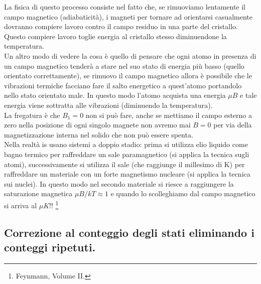 La fisica di questo processo consiste nel fatto che, se rimuoviamo lentamente il campo magnetico (adiabaticità), i magneti per tornare ad orientarsi casualmente dovranno compiere lavoro contro il campo residuo in una parte del cristallo. Questo compiere lavoro toglie energia al cristallo stesso diminuendone la temperatura.\\
Un altro modo di vedere la cosa è quello di pensare che ogni atomo in presenza di un campo magnetico tenderà a stare nel suo stato di energia più basso (quello orientato correttamente), se rimuovo il campo magnetico allora è possibile che le vibrazioni termiche facciano fare il salto energetico a quest'atomo portandolo nello stato orientato male. In questo modo l'atomo acquista una energia $\mu B$ e tale energia viene sottratta alle vibrazioni (diminuendo la temperatura).\\
La fregatura è che $B_1=0$ non si può fare, anche se mettiamo il campo esterno a zero nella posizione di ogni singolo magnete non avremo mai $B = 0$ per via della magnetizzazione interna nel solido che non può essere spenta.\\
Nella realtà is usano sistemi a doppio stadio: prima si utilizza elio liquido come bagno termico per raffreddare un sale paramagnetico (si applica la tecnica sugli atomi), successivamente si utilizza il sale (che raggiunge il millesimo di K) per raffreddare un materiale con un forte magnetismo nucleare (si applica la tecnica sui nuclei). In questo modo nel secondo materiale si riesce a raggiungere la saturazione magnetica $\mu B /kT\approx  1$ e quando lo scolleghiamo dal campo magnetico si arriva al $\mu K$!!
\footnote{Feynmann, Volume II.}
 
\subsection{Correzione al conteggio degli stati eliminando i conteggi ripetuti.}%
